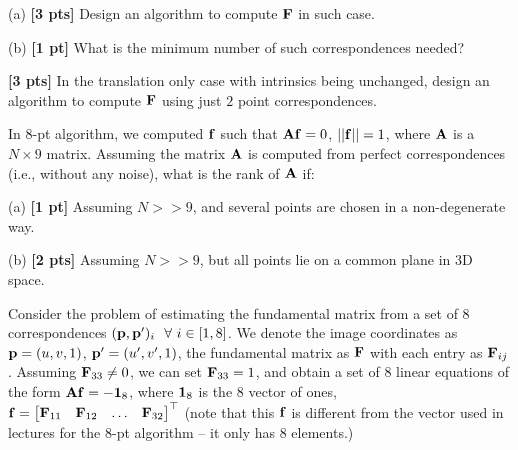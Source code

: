 \begin{questions}
    (a) \textbf{[3 pts]} Design an algorithm to compute $\mathbf{F}$ in such case.

    \begin{tcolorbox}[fit,height=5cm, width=\textwidth, blank, borderline={0.5pt}{-2pt},halign=left, valign=center, nobeforeafter]


    \end{tcolorbox}

    (b) \textbf{[1 pt]} What is the minimum number of such correspondences needed?

    \begin{tcolorbox}[fit,height=3cm, width=\textwidth, blank, borderline={0.5pt}{-2pt},halign=left, valign=center, nobeforeafter]


    \end{tcolorbox}

    \question \textbf{[3 pts]} In the translation only case with intrinsics being unchanged, design an algorithm to compute $\mathbf{F}$ using just $2$ point correspondences.

    \begin{tcolorbox}[fit,height=5cm, width=\textwidth, blank, borderline={0.5pt}{-2pt},halign=left, valign=center, nobeforeafter]


    \end{tcolorbox}

    \clearpage

    \question In $8$-pt algorithm, we computed $\mathbf{f}$ such that $\mathbf{A}\mathbf{f} = 0$, $||\mathbf{f}|| = 1$, where $\mathbf{A}$ is a $N \times 9$ matrix. Assuming the matrix $\mathbf{A}$ is computed from perfect correspondences (i.e., without any noise), what is the rank of $\mathbf{A}$ if:

    (a) \textbf{[1 pt]} Assuming $N >> 9$, and several points are chosen in a non-degenerate way.

    \begin{tcolorbox}[fit,height=3cm, width=\textwidth, blank, borderline={0.5pt}{-2pt},halign=left, valign=center, nobeforeafter]
    \end{tcolorbox}

    (b) \textbf{[2 pts]} Assuming $N >> 9$, but all points lie on a common plane in 3D space.

    \begin{tcolorbox}[fit,height=3cm, width=\textwidth, blank, borderline={0.5pt}{-2pt},halign=left, valign=center, nobeforeafter]
    \end{tcolorbox}

    \question Consider the problem of estimating the fundamental matrix from a set of 8 correspondences $(\mathbf{p}, \mathbf{p}^\prime)_i~~\forall~ i \in [1, 8]$. We denote the image coordinates as $\mathbf{p} = (u, v, 1)$, $\mathbf{p}' = (u', v', 1)$, the fundamental matrix as $\mathbf{F}$ with each entry as $\mathbf{F}_{ij}$. Assuming $\mathbf{F}_{33} \neq 0$, we can set $\mathbf{F}_{33} = 1$, and obtain a set of 8 linear equations of the form $\mathbf{A} \mathbf{f} = -\boldsymbol{1}_8$, where $\boldsymbol{1}_8$ is the 8 vector of ones, $\mathbf{f} = \begin{bmatrix} \mathbf{F}_{11} & \mathbf{F}_{12} & \dots & \mathbf{F}_{32} \end{bmatrix}^\top$ (note  that this $\mathbf{f}$ is different from the vector used in lectures for the 8-pt algorithm -- it only has 8 elements.)


\end{questions}
